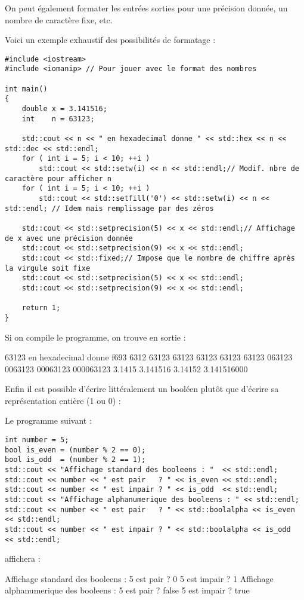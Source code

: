 On peut également formater les entrées sorties pour une précision donnée, un nombre de caractère fixe, etc.

Voici un exemple exhaustif des possibilités de formatage :
\begin{lstlisting}
#include <iostream>
#include <iomanip> // Pour jouer avec le format des nombres

int main()
{
    double x = 3.141516;
    int    n = 63123;

    std::cout << n << " en hexadecimal donne " << std::hex << n << std::dec << std::endl;
    for ( int i = 5; i < 10; ++i )
        std::cout << std::setw(i) << n << std::endl;// Modif. nbre de caractère pour afficher n
    for ( int i = 5; i < 10; ++i )
        std::cout << std::setfill('0') << std::setw(i) << n << std::endl; // Idem mais remplissage par des zéros

    std::cout << std::setprecision(5) << x << std::endl;// Affichage de x avec une précision donnée
    std::cout << std::setprecision(9) << x << std::endl;
    std::cout << std::fixed;// Impose que le nombre de chiffre après la virgule soit fixe
    std::cout << std::setprecision(5) << x << std::endl;
    std::cout << std::setprecision(9) << x << std::endl;

    return 1;
}
\end{lstlisting}

Si on compile le programme, on trouve en sortie :
\begin{inverseverbatim}
63123 en hexadecimal donne f693
6312
 63123
  63123
   63123
    63123
63123
063123
0063123
00063123
000063123
3.1415
3.141516
3.14152
3.141516000
\end{inverseverbatim}

Enfin il est possible d'écrire littéralement un booléen plutôt que d'écrire sa représentation entière (1 ou 0) :

Le programme suivant :
\begin{lstlisting}
int number = 5;
bool is_even = (number % 2 == 0);
bool is_odd  = (number % 2 == 1);
std::cout << "Affichage standard des booleens : "  << std::endl;
std::cout << number << " est pair   ? " << is_even << std::endl;
std::cout << number << " est impair ? " << is_odd  << std::endl;
std::cout << "Affichage alphanumerique des booleens : " << std::endl;
std::cout << number << " est pair   ? " << std::boolalpha << is_even << std::endl;
std::cout << number << " est impair ? " << std::boolalpha << is_odd  << std::endl;
\end{lstlisting}

affichera :

\begin{inverseverbatim}
Affichage standard des booleens : 
5 est pair   ? 0
5 est impair ? 1
Affichage alphanumerique des booleens : 
5 est pair   ? false
5 est impair ? true
\end{inverseverbatim}
